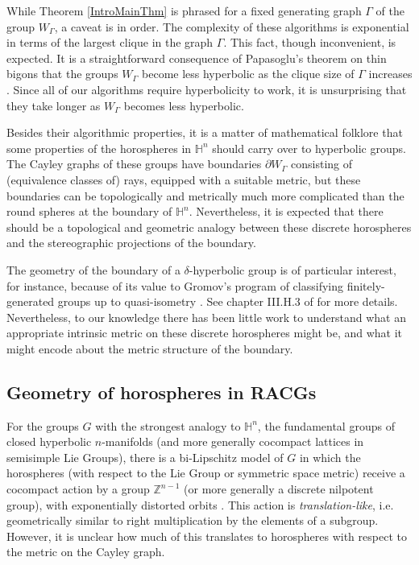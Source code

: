 \documentclass{amsart}
\newcommand{\Z}{\mathbb{Z}}
\newcommand{\h}{\mathbb{H}}
\theoremstyle{definition}
\theoremstyle{remark}
\begin{document}
	While Theorem \ref{IntroMainThm} is phrased for a fixed generating graph $\Gamma$ of the group $W_\Gamma$, a caveat is in order. The complexity of these algorithms is exponential in terms of the largest clique in the graph $\Gamma$. This fact, though inconvenient, is expected. It is a straightforward consequence of Papasoglu's theorem on thin bigons that the groups $W_\Gamma$ become less hyperbolic as the clique size of $\Gamma$ increases \cite{Papasoglu1995}. Since all of our algorithms require hyperbolicity to work, it is unsurprising that they take longer as $W_\Gamma$ becomes less hyperbolic.
	
	Besides their algorithmic properties, it is a matter of mathematical folklore that some properties of the horospheres in $\h^n$ should carry over to hyperbolic groups. The Cayley graphs of these groups have boundaries $\partial W_\Gamma$ consisting of (equivalence classes of) rays, equipped with a suitable metric, but these boundaries can be topologically and metrically much more complicated than the round spheres at the boundary of $\h^n$. Nevertheless, it is expected that there should be a topological and geometric analogy between these discrete horospheres and the stereographic projections of the boundary.
	
	The geometry of the boundary of a $\delta$-hyperbolic group is of particular interest, for instance, because of its value to Gromov's program of classifying finitely-generated groups up to quasi-isometry \cite{GromovAsymptotic}. See chapter III.H.3 of \cite{BridsonHaefliger} for more details. Nevertheless, to our knowledge there has been little work to understand what an appropriate intrinsic metric on these discrete horospheres might be, and what it might encode about the metric structure of the boundary.
    
    \subsection*{Geometry of horospheres in RACGs}
    
    For the groups $G$ with the strongest analogy to $\h^n$, the fundamental groups of closed hyperbolic $n$-manifolds (and more generally cocompact lattices in semisimple Lie Groups), there is a bi-Lipschitz model of $G$ in which the horospheres (with respect to the Lie Group or symmetric space metric) receive a cocompact action by a group $\Z^{n-1}$ (or more generally a discrete nilpotent group), with exponentially distorted orbits \cite{PengitoreMcReynolds}. This action is \textit{translation-like}, i.e. geometrically similar to right multiplication by the elements of a subgroup. However, it is unclear how much of this translates to horospheres with respect to the metric on the Cayley graph.
	
\end{document}
